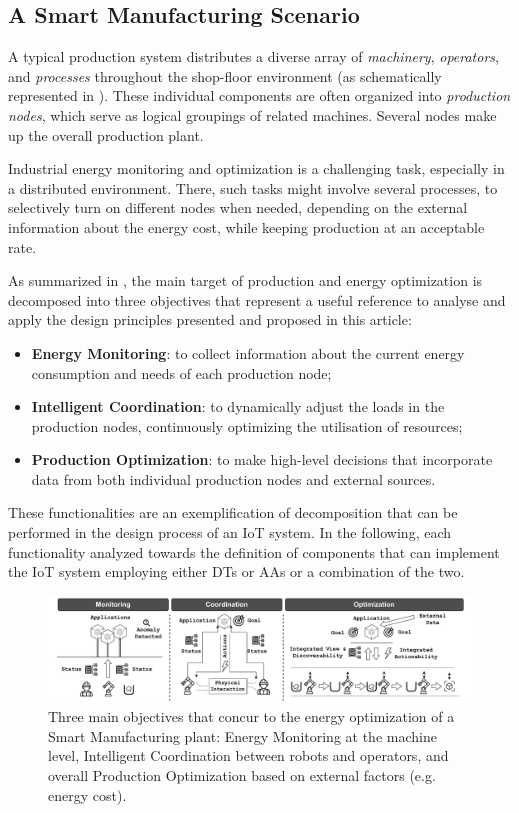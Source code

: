 \subsection{A Smart Manufacturing Scenario}

A typical production system distributes a diverse array of \textit{machinery}, \textit{operators}, and \textit{processes} throughout the shop-floor environment (as schematically represented in ). 
%
These individual components are often organized into \textit{production nodes}, which serve as logical groupings of related machines.
Several nodes make up the overall production plant.

Industrial energy monitoring and optimization is a challenging task, especially in a distributed environment. 
There, such tasks might involve several processes, to selectively turn on different nodes when needed, depending on the external information about the energy cost, while keeping production at an acceptable rate.

As summarized in , the main target of production and energy optimization is decomposed into three objectives that represent a useful reference to analyse and apply the design principles presented and proposed in this article:
\begin{itemize}
    \item \textbf{Energy Monitoring}: to collect information about the current energy consumption and needs of each production node;
    \item \textbf{Intelligent Coordination}: to dynamically adjust the loads in the production nodes, continuously optimizing the utilisation of resources;
    \item \textbf{Production Optimization}: to make high-level decisions that incorporate data from both individual production nodes and external sources.
\end{itemize}
%
These functionalities are an exemplification of decomposition that can be performed in the design process of an IoT system. In the following, each functionality analyzed towards the definition of components that can implement the IoT system employing either DTs or AAs or a combination of the two.

\begin{figure}
    \centering
    \includegraphics[width=\columnwidth]{figures/dt-mas/target_functions.pdf}
    \caption{Three main objectives that concur to the energy optimization of a Smart Manufacturing plant: Energy Monitoring at the machine level, Intelligent Coordination between robots and operators, and overall Production Optimization based on external factors (e.g. energy cost).}
    \label{fig:target_functions}
\end{figure}

